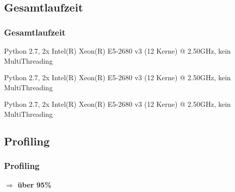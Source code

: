 \subsection{Gesamtlaufzeit}
\begin{frame}[allowframebreaks]
\frametitle{Gesamtlaufzeit}
\begin{center}
\scriptsize
Python 2.7, 2x Intel(R) Xeon(R) E5-2680 v3 (12 Kerne) @ 2.50GHz, kein MultiThreading
\end{center}
\framebreak
\begin{center}
\scriptsize
Python 2.7, 2x Intel(R) Xeon(R) E5-2680 v3 (12 Kerne) @ 2.50GHz, kein MultiThreading
\end{center}
\framebreak
\begin{center}
\scriptsize
Python 2.7, 2x Intel(R) Xeon(R) E5-2680 v3 (12 Kerne) @ 2.50GHz, kein MultiThreading
\end{center}
\framebreak
\end{frame}

\subsection{Profiling}
\begin{frame}[allowframebreaks]
\frametitle{Profiling}
\begin{center}
\framebreak


\framebreak

\textbf{$ \Rightarrow $ über 95\%}
\end{center}
\end{frame}
